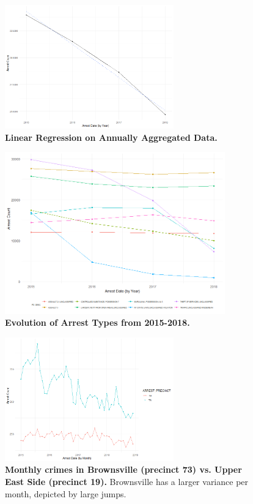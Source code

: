 \documentclass[11pt]{article}\usepackage[]{graphicx}\usepackage[]{color}
\begin{document}
\begin{figure}[H]
  \centering
    \includegraphics[width=0.65\textwidth]{Yearlytrend.png}
  \caption{\textbf{Linear Regression on Annually Aggregated Data.}}
  \label{fig:Yearlytrend}
\end{figure}

\begin{figure}[H]
  \centering
    \includegraphics[width=0.85\textwidth]{crimeOverYears.png}
  \caption{\textbf{Evolution of Arrest Types from 2015-2018.}}
  \label{fig:crimeOverYears}
\end{figure}

\begin{figure}[H]
  \centering
    \includegraphics[width=0.65\textwidth]{BrownUES.png}
  \caption{\textbf{Monthly crimes in Brownsville (precinct 73) vs. Upper East Side (precinct 19).} Brownsville has a larger variance per month, depicted by large jumps.}
  \label{fig:BrownUES}
\end{figure}
\end{document}
